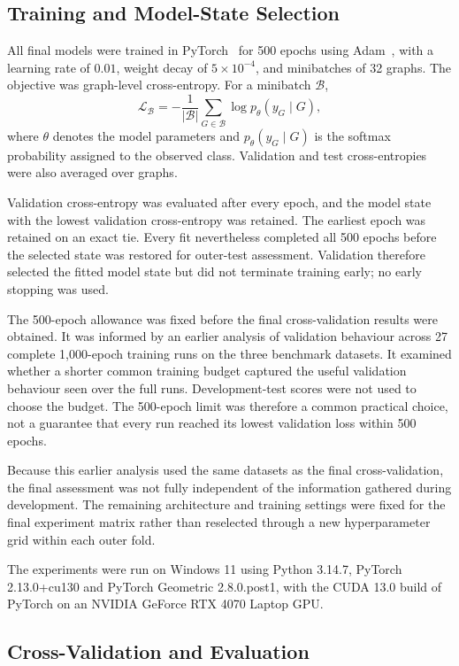 \documentclass[11pt,a4paper]{article}
\begin{document}
\subsection{Training and Model-State Selection}
\label{sec:training}

All final models were trained in PyTorch~\cite{paszke2019pytorch} for 500 epochs using Adam~\cite{kingma2015adam}, with a learning rate of \(0.01\), weight decay of \(5\times10^{-4}\), and minibatches of 32 graphs. The objective was graph-level cross-entropy. For a minibatch \(\mathcal{B}\),
\[
\mathcal{L}_{\mathcal{B}}
=-\frac{1}{|\mathcal{B}|}
\sum_{G\in\mathcal{B}}\log p_\theta(y_G\mid G),
\]
where \(\theta\) denotes the model parameters and \(p_\theta(y_G\mid G)\) is the softmax probability assigned to the observed class. Validation and test cross-entropies were also averaged over graphs.

Validation cross-entropy was evaluated after every epoch, and the model state with the lowest validation cross-entropy was retained. The earliest epoch was retained on an exact tie. Every fit nevertheless completed all 500 epochs before the selected state was restored for outer-test assessment. Validation therefore selected the fitted model state but did not terminate training early; no early stopping was used.

The 500-epoch allowance was fixed before the final cross-validation results were obtained. It was informed by an earlier analysis of validation behaviour across 27 complete 1,000-epoch training runs on the three benchmark datasets. It examined whether a shorter common training budget captured the useful validation behaviour seen over the full runs. Development-test scores were not used to choose the budget. The 500-epoch limit was therefore a common practical choice, not a guarantee that every run reached its lowest validation loss within 500 epochs.

Because this earlier analysis used the same datasets as the final cross-validation, the final assessment was not fully independent of the information gathered during development. The remaining architecture and training settings were fixed for the final experiment matrix rather than reselected through a new hyperparameter grid within each outer fold.

The experiments were run on Windows 11 using Python 3.14.7, PyTorch 2.13.0+cu130 and PyTorch Geometric 2.8.0.post1, with the CUDA 13.0 build of PyTorch on an NVIDIA GeForce RTX 4070 Laptop GPU.

\subsection{Cross-Validation and Evaluation}
\label{sec:evaluation}
\end{document}
